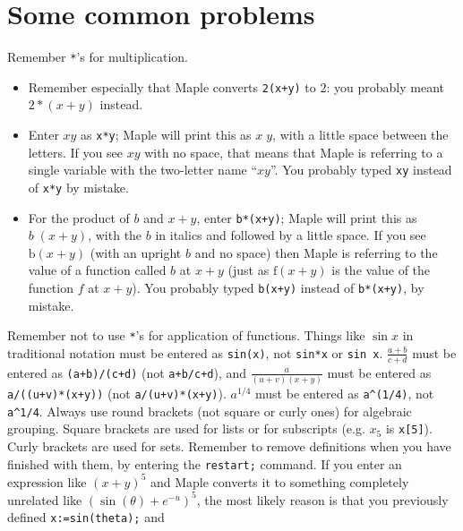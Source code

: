 \documentclass{amsart}
\begin{document}
\section{Some common problems}\label{sec-problems}
\setcounter{notecounter}{0}


\begin{itemize}
%
  Remember \verb~*~'s for multiplication.  
  \begin{itemize}
   \item Remember especially that Maple converts
    \verb~2(x+y)~ to $2$: you probably meant $2*(x+y)$
    instead. 
   \item Enter $xy$ as \verb~x*y~; Maple will print this as
    $x\;y$, with a little space between the letters.  If you
    see $xy$ with no space, that means that Maple is
    referring to a single variable with the two-letter name
    ``$xy$''.  You probably typed \verb~xy~ instead of
    \verb~x*y~ by mistake. 
   \item For the product of $b$ and $x+y$, enter
    \verb~b*(x+y)~; Maple will print this as $b\;(x+y)$,
    with the $b$ in italics and followed by a little space. 
    If you see $\text{b}(x+y)$ (with an upright $b$ and no
    space) then Maple is referring to the value of a
    function called $b$ at $x+y$ (just as $\text{f}(x+y)$ is
    the value of the function $f$ at $x+y$).  You probably
    typed \verb~b(x+y)~ instead of \verb~b*(x+y)~, by
    mistake. 
  \end{itemize}
%
  Remember not to use \verb~*~'s for application of
  functions. Things like $\sin x$ in traditional notation
  must be entered as \verb~sin(x)~, not \verb~sin*x~ or
  \verb~sin x~. 
%
  $\frac{a+b}{c+d}$ must be entered as
  \verb~(a+b)/(c+d)~ (not \verb~a+b/c+d~), and
   $\frac{a}{(u+v)(x+y)}$ must be entered as
   \verb~a/((u+v)*(x+y))~ (not \verb~a/(u+v)*(x+y)~). 
%
  $a^{1/4}$ must be entered as \verb~a^(1/4)~, not
         \verb~a^1/4~. 
%
  Always use round brackets (not square or curly
         ones) for algebraic grouping.  Square brackets are
         used for lists or for subscripts (e.g. $x_5$ is
         \verb~x[5]~).  Curly brackets are used for sets. 
%
  Remember to remove definitions when you
  have finished with 
  them, by entering the \verb~restart;~ command.  If you
  enter an expression like $(x+y)^5$ and Maple converts it
  to something completely unrelated like
  $(\sin(\theta)+e^{-u})^5$, the most likely reason is that
  you previously defined \verb~x:=sin(theta);~ and

\end{itemize}
\end{document}
